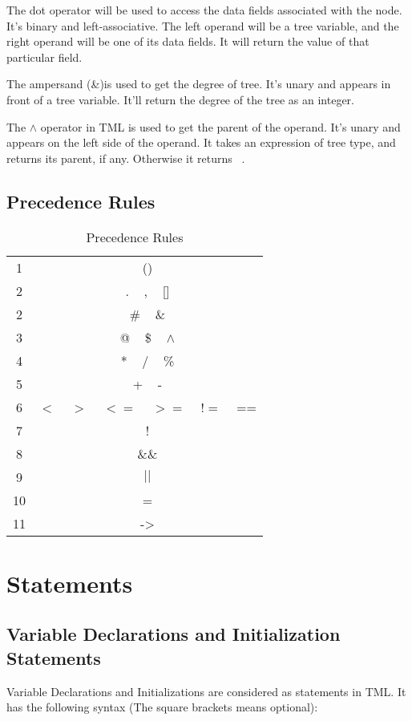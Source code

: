 \documentclass[12pt,psfig,a4]{article}
\begin{document}
The dot operator will be used to access the data fields associated with the node. It's binary and left-associative. The left operand will be a tree variable, and the right operand will be one of its data fields. It will return the value of that particular field.

The ampersand (\&)is used to get the degree of tree. It's unary and appears in front of a tree variable. It'll return the degree of the tree as an integer.

The $\wedge$ operator in TML is used to get the parent of the operand. It's unary and appears on the left side of the operand. It takes an expression of tree type, and returns its parent, if any. Otherwise it returns ~.

\subsection{Precedence Rules}
\begin{table}[ht]
\begin{center}
\begin{tabular}{| c | c |}
\hline
1 & () \\
2 & . ~ , ~ [] \\
2 & \# ~ \& \\
3 & @ ~ \$ ~ $\wedge$ \\
4 & * ~ / ~ \% \\
5 & + ~ - \\
6 & $<$ ~ $>$ ~ $<=$ ~ $>=$ ~ $!=$ ~ == \\
7 & ! \\
8 & \&\& \\
9 & $||$ \\
10 & =\\%
11 & -\textgreater \\
\hline
\end{tabular}
\caption{Precedence Rules}
\label{preRule}
\end {center}
\end{table}

\section{Statements}

\subsection{Variable Declarations and Initialization Statements}
Variable Declarations and Initializations are considered as statements in TML. It has the following syntax (The square brackets means optional):
\end{document}

